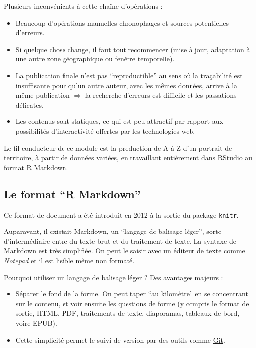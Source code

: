 \documentclass[]{article}
\providecommand{\tightlist}{%
  \setlength{\itemsep}{0pt}\setlength{\parskip}{0pt}}
\begin{document}
Plusieurs inconvénients à cette chaîne d'opérations :

\begin{itemize}
\tightlist
\item
  Beaucoup d'opérations manuelles chronophages et sources potentielles
  d'erreurs.
\item
  Si quelque chose change, il faut tout recommencer (mise à jour,
  adaptation à une autre zone géographique ou fenêtre temporelle).
\item
  La publication finale n'est pas ``reproductible'' au sens où la
  traçabilité est insuffisante pour qu'un autre auteur, avec les mêmes
  données, arrive à la même publication \(\Rightarrow\) la recherche
  d'erreurs est difficile et les passations délicates.
\item
  Les contenus sont statiques, ce qui est peu attractif par rapport aux
  possibilités d'interactivité offertes par les technologies web.
\end{itemize}

Le fil conducteur de ce module est la production de A à Z d'un portrait
de territoire, à partir de données variées, en travaillant entièrement
dans RStudio au format R Markdown.

\subsection{\texorpdfstring{Le format ``R
Markdown''}{Le format R Markdown}}\label{le-format-r-markdown}

Ce format de document a été introduit en 2012 à la sortie du package
\texttt{knitr}.

Auparavant, il existait Markdown, un ``langage de balisage léger'',
sorte d'intermédiaire entre du texte brut et du traitement de texte. La
syntaxe de Markdown est très simplifiée. On peut le saisir avec un
éditeur de texte comme \emph{Notepad} et il est lisible même non
formaté.

Pourquoi utiliser un langage de balisage léger ? Des avantages majeurs :

\begin{itemize}
\tightlist
\item
  Séparer le fond de la forme. On peut taper ``au kilomètre'' en se
  concentrant sur le contenu, et voir ensuite les questions de forme (y
  compris le format de sortie, HTML, PDF, traitements de texte,
  diaporamas, tableaux de bord, voire EPUB).
\item
  Cette simplicité permet le suivi de version par des outils comme
  \href{https://fr.wikipedia.org/wiki/Git}{Git}.
\end{itemize}
\end{document}
